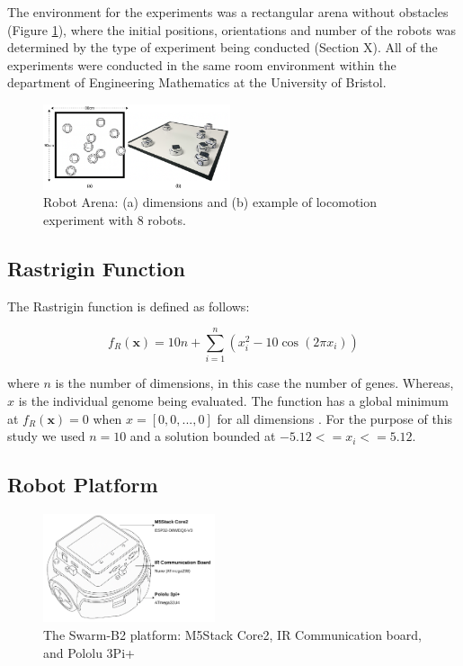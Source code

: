\documentclass[conference]{IEEEtran}
\begin{document}
The environment for the experiments was a rectangular arena without obstacles (Figure \ref{fig:arena}), where the initial positions, orientations and number of the robots was determined by the type of experiment being conducted (Section X). All of the experiments were conducted in the same room environment within the department of Engineering Mathematics at the University of Bristol.

\begin{figure}[h]
    \centering
    \includegraphics[width=0.49\textwidth]{arena.png}
    \caption{Robot Arena: (a) dimensions and (b) example of locomotion experiment with 8 robots.}
    \label{fig:arena}
\end{figure}


\subsection{Rastrigin Function}

The Rastrigin function is defined as follows:

\begin{equation}\label{eq:rastrigin}
f_R(\mathbf{x}) = 10n + \sum_{i=1}^{n} \left(x_i^2 - 10\cos(2\pi x_i)\right)
\end{equation}

where $n$ is the number of dimensions, in this case the number of genes. Whereas, $x$ is the individual genome being evaluated. The function has a global minimum at \( f_R(\mathbf{x}) = 0 \) when $x = [0, 0, ..., 0]$ for all dimensions \cite{rucinski_impact_2010}. For the purpose of this study we used $n = 10$ and a solution bounded at $-5.12<=x_i<=5.12$.

\subsection{Robot Platform}\label{sec:robot_platform}
\begin{figure}[h]
    \centering
    \includegraphics[width=0.45\textwidth]{B2.pdf}
    \caption{The Swarm-B2 platform: M5Stack Core2, IR Communication board, and Pololu 3Pi+}
    \label{fig:B2}
\end{figure}
\end{document}

